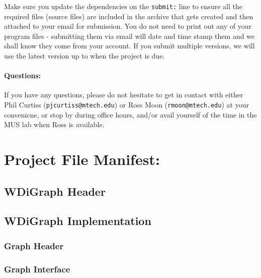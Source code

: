 \documentclass[10pt,letterpaper]{article}
\begin{document}
Make sure you update the dependencies on the \verb|submit:| line to ensure all the required files (source files) are included in the archive that gets created and then attached to your email for submission. You do not need to print out any of your program files - submitting them via email will date and time stamp them and we shall know they come from your account. If you submit multiple versions, we will use the latest version up to when the project is due. 

\paragraph{Questions:} If you have any questions, please do not hesitate to get in contact with either Phil Curtiss (\verb|pjcurtiss@mtech.edu|) or Ross Moon (\verb|rmoon@mtech.edu|) at your convenicne, or stop by during office hours, and/or avail yourself of the time in the MUS lab when Ross is available. 

\section*{Project File Manifest:}

\subsection*{WDiGraph Header}



\noindent\hrulefill

\subsection*{WDiGraph Implementation}



\noindent\hrulefill

\subsubsection*{Graph Header}



\noindent\hrulefill

\subsubsection*{Graph Interface}


\end{document}
